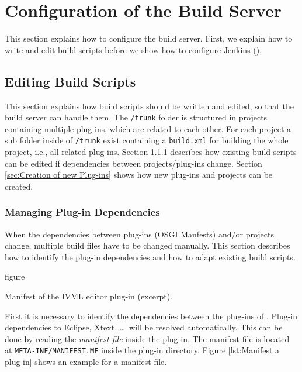 \section{Configuration of the Build Server}
\label{sec:Build Server}
This section explains how to configure the build server. First, we explain how to write and edit build scripts before we show how to configure Jenkins (\Jenkins).

\subsection{Editing Build Scripts}
\label{sec:Editing Build Scripts}
This section explains how build scripts should be written and edited, so that the build server can handle them. The \texttt{/trunk} folder is structured in projects containing multiple plug-ins, which are related to each other. For each project a sub folder inside of \texttt{/trunk} exist containing a \texttt{build.xml} for building the whole project, i.e., all related plug-ins. Section \ref{sec:Managing Plug-in Dependencies} describes how existing build scripts can be edited if dependencies between projects/plug-ins change. Section \ref{sec:Creation of new Plug-ins} shows how new plug-ins and projects can be created.

\subsubsection{Managing Plug-in Dependencies}
\label{sec:Managing Plug-in Dependencies}
When the dependencies between plug-ins (OSGI Manfests) and/or projects change, multiple build files have to be changed manually. This section describes how to identify the plug-in dependencies and how to adapt existing build scripts.

\begin{nofloat}{figure}
	\centering
	
	\caption[Manifest of the IVML editor]{Manifest of the IVML editor plug-in (excerpt).}
	\label{lst:Manifest a plug-in}
\end{nofloat}

First it is necessary to identify the dependencies between the plug-ins of \EASy. Plug-in dependencies to Eclipse, Xtext, \ldots\ will be resolved automatically. This can be done by reading the \textit{manifest file} inside the plug-in. The manifest file is located at \texttt{META-INF/MANIFEST.MF} inside the plug-in directory. Figure \vref{lst:Manifest a plug-in} shows an example for a manifest file.

